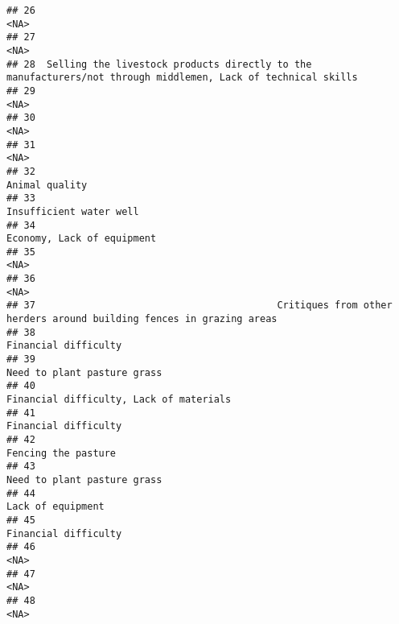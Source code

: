 \documentclass[
]{article}
\begin{document}
\begin{verbatim}
## 26                                                                                                          <NA>
## 27                                                                                                          <NA>
## 28  Selling the livestock products directly to the manufacturers/not through middlemen, Lack of technical skills
## 29                                                                                                          <NA>
## 30                                                                                                          <NA>
## 31                                                                                                          <NA>
## 32                                                                                                Animal quality
## 33                                                                                       Insufficient water well
## 34                                                                                    Economy, Lack of equipment
## 35                                                                                                          <NA>
## 36                                                                                                          <NA>
## 37                                          Critiques from other herders around building fences in grazing areas
## 38                                                                                          Financial difficulty
## 39                                                                                   Need to plant pasture grass
## 40                                                                       Financial difficulty, Lack of materials
## 41                                                                                          Financial difficulty
## 42                                                                                           Fencing the pasture
## 43                                                                                   Need to plant pasture grass
## 44                                                                                             Lack of equipment
## 45                                                                                          Financial difficulty
## 46                                                                                                          <NA>
## 47                                                                                                          <NA>
## 48                                                                                                          <NA>

\end{verbatim}
\end{document}
